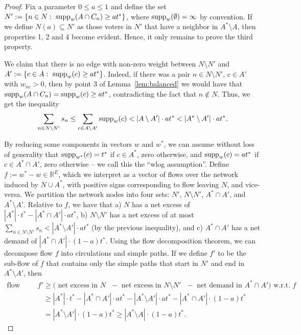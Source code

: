 \begin{proof}
Fix a parameter $0\leq a\leq 1$ and define the set $N':=\{n\in N: \ \supp_w(A\cap C_n)\geq at^*\}$, where $\operatorname{supp}_w(\emptyset)=\infty$ by convention. If we define $N(a)\subseteq N'$ as those voters in $N'$ that have a neighbor in $A^*\setminus A$, then properties 1, 2 and 4 become evident. Hence, it only remains to prove the third property.

We claim that there is no edge with non-zero weight between $N\setminus N'$ and $A':=\{c\in A: \ \operatorname{supp}_w(c)\geq at^*\}$. 
Indeed, if there was a pair $n\in N\setminus N'$, $c\in A'$ with $w_{nc}>0$, then by point 3 of Lemma~\ref{lem:balanced} we would have that $\operatorname{supp}_w(A\cap C_n)=\operatorname{supp}_w(c)\geq at^*$, contradicting the fact that $n\not\in N$. 
Thus, we get the inequality
$$\sum_{n\in N\setminus N'} s_n \leq \sum_{c\in A\setminus A'} \operatorname{supp}_w(c) < |A\setminus A'|\cdot at^*< |A^*\setminus A'|\cdot at^*.$$

By reducing some components in vectors $w$ and $w^*$, we can assume without loss of generality that $\operatorname{supp}_{w^*}(c)=t^*$ if $c\in A^*$, zero otherwise, and $\operatorname{supp}_{w}(c)=a t^*$ if $c\in A^*\cap A'$, zero otherwise -- we call this the ``wlog assumption''.
Define $f:=w^* - w\in\mathbb{R}^E$, which we interpret as a vector of flows over the network induced by $N\cup A^*$, with positive signs corresponding to flow leaving $N$, and vice-versa. We partition the network nodes into four sets: $N'$, $N\setminus N'$, $A^*\cap A'$, and $A^*\setminus A'$. Relative to $f$, we have that a) $N$ has a net excess of $|A^*|\cdot t^* - |A^*\cap A'|\cdot a t^*$, b) $N\setminus N'$ has a net excess of at most $\sum_{n\in N\setminus N'} s_n < |A^*\setminus A'|\cdot at^*$ (by the previous inequality), and c) $A^*\cap A'$ has a net demand of $|A^*\cap A'|\cdot (1-a) t^*$. 
Using the flow decomposition theorem, we can decompose flow $f$ into circulations and simple paths. If we define $f'$ to be the sub-flow of $f$ that contains only the simple paths that start in $N'$ and end in $A^*\setminus A'$, then %
%
\begin{align*}
    \text{flow value in } f' &\geq (\text{ net excess in $N$ } - \text{ net excess in $N\setminus N'$ } - \text{ net demand in $A^*\cap A')$ w.r.t. } f\\
    &\geq |A^*|\cdot t^* - |A^*\cap A'|\cdot a t^* -|A^*\setminus A'|\cdot a t^* -|A^*\cap A'|\cdot (1-a) t^*\\
    & = |A^*\setminus A'|\cdot (1-a)t^* \geq |A^* \setminus A|\cdot (1-a)t^*.
\end{align*}


\end{proof}
